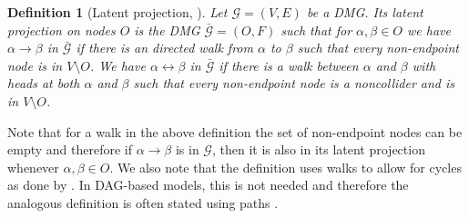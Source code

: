 \documentclass[accepted]{uai2021} %
\newtheorem{defn}[thm]{Definition}
\begin{document}
\begin{defn}[Latent projection, \cite{vermaEquiAndSynthesis,richardson2017}]
	\label{def:latProj}
	Let $\mathcal{G} = (V,E)$ be a DMG. Its latent projection on nodes $O$ is 
	the DMG $\bar{\mathcal{G}} = (O,F)$ such that for $\alpha,\beta\in O$ we 
	have $\alpha\rightarrow\beta$ in $\bar{\mathcal{G}}$ if there is an 
	directed walk from $\alpha$ to $\beta$ such that every non-endpoint node is 
	in $V\setminus O$. We have 
	$\alpha\leftrightarrow\beta$ in $\bar{\mathcal{G}}$ if there is a walk 
	between $\alpha$ and $\beta$ with heads at 
	both $\alpha$ and $\beta$ such that every non-endpoint node is a 
	noncollider and is in 
	$V\setminus O$.
\end{defn}

Note that for a walk in the above definition the set of non-endpoint nodes can 
be empty and therefore if $\alpha\rightarrow\beta$ is in $\mathcal{G}$, then it 
is 
also in its latent projection whenever $\alpha,\beta\in O$. We also note that 
the definition uses walks to 
allow for cycles as done by \cite{mogensen2018}. In DAG-based models, this is 
not needed 
and therefore the analogous definition is often stated using paths 
\citep{richardson2017}.
\end{document}
